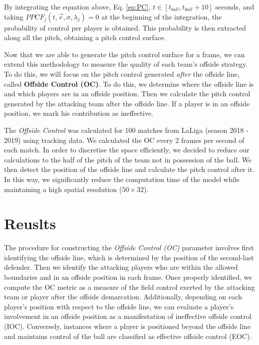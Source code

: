 \documentclass[
  10pt,
  twoside,nohyper]{book}
\begin{document}
By integrating the equation above, Eq. \eqref{eq:PC}, \(t \in \left[ t_{ball},t_{ball} + 10 \right]\) seconds, and taking \(P P C F_j\left(t, \vec{r} , \sigma, \lambda_j\right) = 0\) at the beginning of the integration, the probability of control per player is obtained. This probability is then extracted along all the pitch, obtaining a pitch control surface.

Now that we are able to generate the pitch control surface for a frame, we can extend this methodology to measure the quality of each team's offside strategy. To do this, we will focus on the pitch control generated \emph{after} the offside line, called \textbf{Offside Control (OC)}. To do this, we determine where the offside line is and which players are in an offside position. Then we calculate the pitch control generated by the attacking team after the offside line. If a player is in an offside position, we mark his contribution as ineffective.

The \emph{Offside Control} was calculated for 100 matches from LaLiga (season 2018 - 2019) using tracking data. We calculated the OC every 2 frames per second of each match. In order to discretise the space efficiently, we decided to reduce our calculations to the half of the pitch of the team not in possession of the ball. We then detect the position of the offside line and calculate the pitch control after it. In this way, we significantly reduce the computation time of the model while maintaining a high spatial resolution (\(50 \times 32\)).

\chapter{Reuslts}\label{reuslts}

The procedure for constructing the \emph{Offside Control (OC)} parameter involves first identifying the offside line, which is determined by the position of the second-last defender. Then we identify the attacking players who are within the allowed boundaries and in an offside position in each frame. Once properly identified, we compute the OC metric as a measure of the field control exerted by the attacking team or player after the offside demarcation. Additionally, depending on each player's position with respect to the offside line, we can evaluate a player's involvement in an offside position as a manifestation of ineffective offside control (IOC). Conversely, instances where a player is positioned beyond the offside line and maintains control of the ball are classified as effective offside control (EOC).
\end{document}
